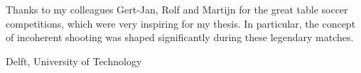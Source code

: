 \documentclass[a4paper,11pt]{mscThesis}
\begin{document}
    \printnomenclature
    \cleardoublepage
%
%
%
\mainmatter
%
\cleardoublepage

%
		
    	
    	
    	
    	
    	
    	

    Thanks to my colleagues Gert-Jan, Rolf and Martijn for the great table soccer competitions, which were very inspiring for my thesis. In particular, the concept of incoherent shooting was shaped significantly during these legendary matches.

    \vspace*{15mm}

    \noindent
    Delft, University of Technology \hfill \mscname\\ %
    \mscdate


%
    


\appendix
\end{document}
